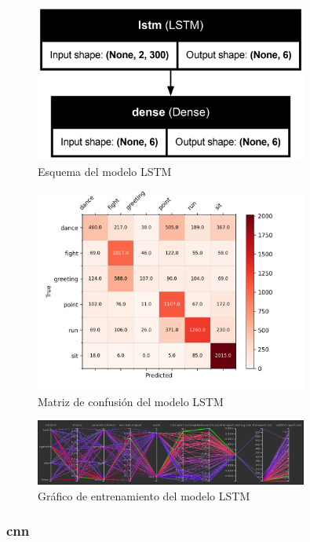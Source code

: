 \begin{figure}[h!]
    \centering
    \includegraphics[width=0.8\textwidth]{Imagenes/Bitmap/best-lstm0.8.png}
    \caption{Esquema del modelo LSTM}
    \label{fig:lstm-0.8-ejemplo}
\end{figure}
\begin{figure}[h!]
    \centering
    \includegraphics[width=0.8\textwidth]{Imagenes/Bitmap/CM_best-lstm0.8.png}
    \caption{Matriz de confusión del modelo LSTM}
    \label{fig:lstm-0.8-matriz-ejemplo}
\end{figure}
\begin{figure}[h!]
    \centering
    \includegraphics[width=0.8\textwidth]{Imagenes/Bitmap/tb-lstm-0.8.png}
    \caption{Gráfico de entrenamiento del modelo LSTM}
    \label{fig:lstm-0.8-grafico-ejemplo}
\end{figure}

\subsubsection{\gls{cnn}}


